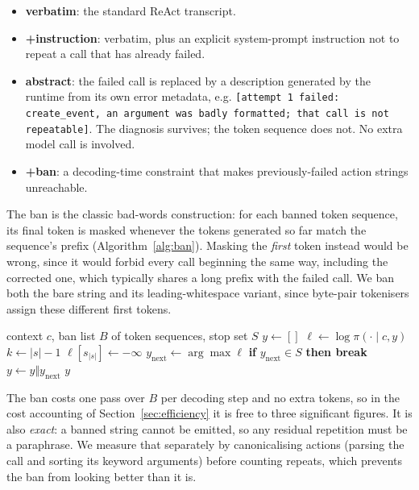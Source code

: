 \begin{itemize}\itemsep2pt
\item \textbf{verbatim}: the standard ReAct transcript.
\item \textbf{+instruction}: verbatim, plus an explicit system-prompt
instruction not to repeat a call that has already failed.
\item \textbf{abstract}: the failed call is replaced by a description
generated by the runtime from its own error metadata, e.g.
      \texttt{[attempt 1 failed: create\_event, an argument was badly
formatted; that call is not repeatable]}. The diagnosis survives; the
      token sequence does not. No extra model call is involved.
\item \textbf{+ban}: a decoding-time constraint that makes
previously-failed action strings unreachable.
\end{itemize}

The ban is the classic bad-words construction: for each banned token sequence,
its final token is masked whenever the tokens generated so far match the
sequence's prefix (Algorithm~\ref{alg:ban}). Masking the \emph{first} token instead would be wrong, since it would forbid
every call beginning the same way,
including the corrected one, which typically shares a long prefix with the
failed call. We ban both the bare string and its leading-whitespace variant,
since byte-pair tokenisers assign these different first tokens.

\begin{algorithm}[t]
\small
\caption{Decoder-level suppression of failed actions}
\label{alg:ban}
\begin{algorithmic}[1]
\Require context $c$, ban list $B$ of token sequences, stop set $S$
\State $y \gets []$
  \State $\ell \gets \log \pi(\cdot \mid c, y)$
    \State $k \gets |s| - 1$
      \State $\ell[s_{|s|}] \gets -\infty$ 
    \EndIf
  \EndFor
  \State $y_{\text{next}} \gets \arg\max \ell$
  \State \textbf{if} $y_{\text{next}} \in S$ \textbf{then break}
  \State $y \gets y \Vert y_{\text{next}}$
\EndWhile
\State \Return $y$
\end{algorithmic}
\end{algorithm}

The ban costs one pass over $B$ per decoding step and no extra tokens, so in the
cost accounting of Section~\ref{sec:efficiency} it is free to three significant
figures. It is also \emph{exact}: a banned string cannot be emitted, so any
residual repetition must be a paraphrase. We measure that separately by
canonicalising actions (parsing the call and sorting its keyword arguments)
before counting repeats, which prevents the ban from looking better than it is.

